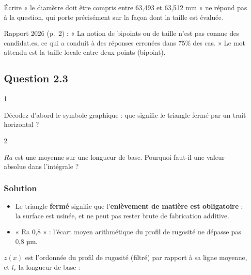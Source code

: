 \documentclass[11pt,a4paper]{article}
\providecommand{\tightlist}{\setlength{\itemsep}{0pt}\setlength{\parskip}{0pt}}
\begin{document}
\begin{piege}

Écrire « le diamètre doit être compris entre 63,493 et 63,512 mm » ne répond pas à la question, qui porte précisément sur la façon dont la taille est évaluée.

\end{piege}

\begin{jury}

Rapport 2026 (p.~2) : « La notion de bipoints ou de taille n'est pas connue des candidat.es, ce qui a conduit à des réponses erronées dans 75\% des cas. » Le mot attendu est la taille locale entre deux points (bipoint).

\end{jury}

\hypertarget{question-2.3}{%
\subsection{Question 2.3}\label{question-2.3}}

\begin{indication}{1}

Décodez d'abord le symbole graphique : que signifie le triangle fermé par un trait horizontal ?

\end{indication}

\begin{indication}{2}

\(Ra\) est une moyenne sur une longueur de base. Pourquoi faut-il une valeur absolue dans l'intégrale ?

\end{indication}

\hypertarget{solution-16}{%
\subsubsection{Solution}\label{solution-16}}

\begin{itemize}
\tightlist
\item
  Le triangle \textbf{fermé} signifie que l'\textbf{enlèvement de matière est obligatoire} : la surface est usinée, et ne peut pas rester brute de fabrication additive.
\item
  « Ra 0,8 » : l'écart moyen arithmétique du profil de rugosité ne dépasse pas 0,8 µm.
\end{itemize}

\(z(x)\) est l'ordonnée du profil de rugosité (filtré) par rapport à sa ligne moyenne, et \(l_r\) la longueur de base :
\end{document}
